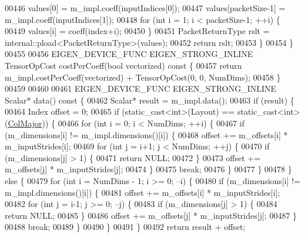 \begin{DoxyCode}
00446       values[0] = m\_impl.coeff(inputIndices[0]);
00447       values[packetSize-1] = m\_impl.coeff(inputIndices[1]);
00448       \textcolor{keywordflow}{for} (\textcolor{keywordtype}{int} i = 1; i < packetSize-1; ++i) \{
00449         values[i] = coeff(index+i);
00450       \}
00451       PacketReturnType rslt = internal::pload<PacketReturnType>(values);
00452       \textcolor{keywordflow}{return} rslt;
00453     \}
00454   \}
00455 
00456   EIGEN\_DEVICE\_FUNC EIGEN\_STRONG\_INLINE TensorOpCost costPerCoeff(\textcolor{keywordtype}{bool} vectorized)\textcolor{keyword}{ const }\{
00457     \textcolor{keywordflow}{return} m\_impl.costPerCoeff(vectorized) + TensorOpCost(0, 0, NumDims);
00458   \}
00459 
00460 
00461   EIGEN\_DEVICE\_FUNC EIGEN\_STRONG\_INLINE Scalar* data()\textcolor{keyword}{ const }\{
00462     Scalar* result = m\_impl.data();
00463     \textcolor{keywordflow}{if} (result) \{
00464       Index offset = 0;
00465       \textcolor{keywordflow}{if} (static\_cast<int>(Layout) == static\_cast<int>(\hyperlink{group__enums_ggaacded1a18ae58b0f554751f6cdf9eb13a0cbd4bdd0abcfc0224c5fcb5e4f6669a}{ColMajor})) \{
00466         \textcolor{keywordflow}{for} (\textcolor{keywordtype}{int} i = 0; i < NumDims; ++i) \{
00467           \textcolor{keywordflow}{if} (m\_dimensions[i] != m\_impl.dimensions()[i]) \{
00468             offset += m\_offsets[i] * m\_inputStrides[i];
00469             \textcolor{keywordflow}{for} (\textcolor{keywordtype}{int} j = i+1; j < NumDims; ++j) \{
00470               \textcolor{keywordflow}{if} (m\_dimensions[j] > 1) \{
00471                 \textcolor{keywordflow}{return} NULL;
00472               \}
00473               offset += m\_offsets[j] * m\_inputStrides[j];
00474             \}
00475             \textcolor{keywordflow}{break};
00476           \}
00477         \}
00478       \} \textcolor{keywordflow}{else} \{
00479         \textcolor{keywordflow}{for} (\textcolor{keywordtype}{int} i = NumDims - 1; i >= 0; --i) \{
00480           \textcolor{keywordflow}{if} (m\_dimensions[i] != m\_impl.dimensions()[i]) \{
00481             offset += m\_offsets[i] * m\_inputStrides[i];
00482             \textcolor{keywordflow}{for} (\textcolor{keywordtype}{int} j = i-1; j >= 0; --j) \{
00483               \textcolor{keywordflow}{if} (m\_dimensions[j] > 1) \{
00484                 \textcolor{keywordflow}{return} NULL;
00485               \}
00486               offset += m\_offsets[j] * m\_inputStrides[j];
00487             \}
00488             \textcolor{keywordflow}{break};
00489           \}
00490         \}
00491       \}
00492       \textcolor{keywordflow}{return} result + offset;

\end{DoxyCode}

